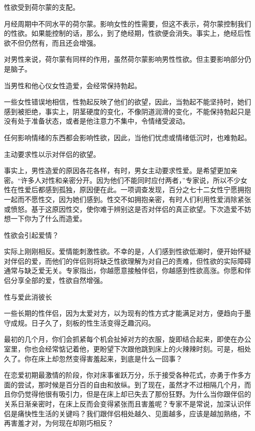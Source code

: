 \documentclass[12pt,UTF8]{ctexbook}
\begin{document}
性欲受到荷尔蒙的支配。

月经周期中不同水平的荷尔蒙。影响女性的性需要，但这不表示，荷尔蒙控制我们的性欲。如果能控制的话，那么，到了绝经期，性欲便会消失。事实上，绝经后性欲不但仍然有，而且还会增强。

对男性来说，荷尔蒙有同样的作用，虽然荷尔蒙影响男性性欲。但主要影响部分仍是脑子。

当男性和他心仪女性造爱，会经常保持勃起。

一些女性错误地相信，性勃起反映了他们的欲望，因此，当勃起不能坚持时，她们感到被拒绝，事实上，阴茎硬度的变化，不像阴道润滑的变化，不能保持勃起只是没有处于准备状态，或者是他注意力不集中，令情绪受波动。

任何影响情绪的东西都会影响性欲，因此，当他们忧虑或情绪低沉时，也难勃起。

主动要求性以示对伴侣的欲望。

事实上，男性造爱的原因各花各样，有时，男女主动要求性爱。是希望更加亲密。“许多人对性和亲密分开。因为他们不能同时应付两者，”专家说，所以不少女性在性爱后都感到孤独，原因便在此。一项调查发现，百分之七十二女性宁愿拥抱一起而不愿性交，因为她们感到。性交不如拥抱亲密，有时人们利用性爱消除紧张或愤怒。基于这原因性交，使你难于辨别这是否对伴侣的真正欲望。下次造爱不妨想一下你为了什么而造爱。

性欲会引起爱情？

实际上刚刚相反。爱情能刺激性欲。不幸的是，人们感到性欲低潮时，便开始怀疑对伴侣的爱，而他们的伴侣则将缺乏性欲理解为对自己的责难，但性欲的实际障碍通常与缺乏爱无关。专家指出，你越愿意接触伴侣，你越感到性欲高涨。你愿和伴侣分享全部的爱，性欲自然增强。





性与爱此消彼长


一些长期的性伴侣，因为太爱对方，以为现有的性方式才能满足对方，便趋向于墨守成规。日子久了，刻板的性生活变得乏趣沉闷。

最初的几个月，你们会抓紧每个机会扯掉对方的衣服，旋即结合起来，即使在办公室里，你也会经常惦记着他，更盼望下次跟他跳到床上的火辣辣时刻。可是，相处久了。你在床上却忽然变得害羞起来，到底是什么一回事？

在恋爱初期最激情的阶段，你对床事雀跃万分，乐于接受各种花式，亦勇于作多方面的尝试，那时候是百分百的自由和放纵。到了现在，虽然才不过相隔几个月，而且你仍觉得他很有吸引力，但是在床上却已失去了那份狂野。为什么当你跟伴侣的关系日渐亲密时，在床上反而会变得紧张而且害羞呢？专家不是常说，加深认识伴侣是痛快性生活的关键吗？我们跟伴侣相处越久、见面越多，应该是越加熟络，不再害羞才对，为何现在却刚巧相反？
\end{document}
